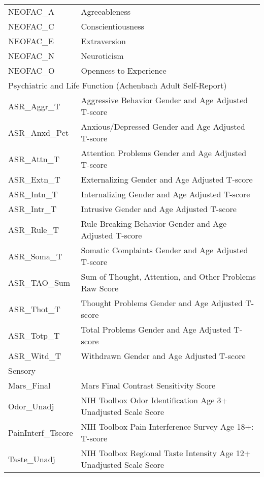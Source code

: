 \documentclass{article}
\begin{document}
\begin{longtable}{ll}
\midrule
NEOFAC\_A & Agreeableness\\
NEOFAC\_C & Conscientiousness\\
NEOFAC\_E & Extraversion\\
NEOFAC\_N & Neuroticism\\
NEOFAC\_O & Openness to Experience\\
\midrule
\multicolumn{2}{l}{Psychiatric and Life Function (Achenbach Adult Self-Report)}\\
\midrule
ASR\_Aggr\_T & Aggressive Behavior Gender and Age Adjusted T-score\\
ASR\_Anxd\_Pct & Anxious/Depressed Gender and Age Adjusted T-score\\
ASR\_Attn\_T & Attention Problems Gender and Age Adjusted T-score\\
ASR\_Extn\_T & Externalizing Gender and Age Adjusted T-score\\
ASR\_Intn\_T & Internalizing Gender and Age Adjusted T-score\\
ASR\_Intr\_T & Intrusive Gender and Age Adjusted T-score\\
ASR\_Rule\_T & Rule Breaking Behavior Gender and Age Adjusted T-score\\
ASR\_Soma\_T & Somatic Complaints Gender and Age Adjusted T-score\\
ASR\_TAO\_Sum & Sum of Thought, Attention, and Other Problems Raw Score\\
ASR\_Thot\_T & Thought Problems Gender and Age Adjusted T-score\\
ASR\_Totp\_T & Total Problems Gender and Age Adjusted T-score \\
ASR\_Witd\_T & Withdrawn Gender and Age Adjusted T-score\\
\midrule
\multicolumn{2}{l}{Sensory}\\
\midrule
Mars\_Final & Mars Final Contrast Sensitivity Score\\
Odor\_Unadj & NIH Toolbox Odor Identification Age 3+ Unadjusted Scale Score\\
PainInterf\_Tscore & NIH Toolbox Pain Interference Survey Age 18+: T-score \\
Taste\_Unadj & NIH Toolbox Regional Taste Intensity Age 12+ Unadjusted Scale Score \\
\bottomrule
\end{longtable}
\label{tab:phenotypes-hcp}

\newpage
\end{document}
